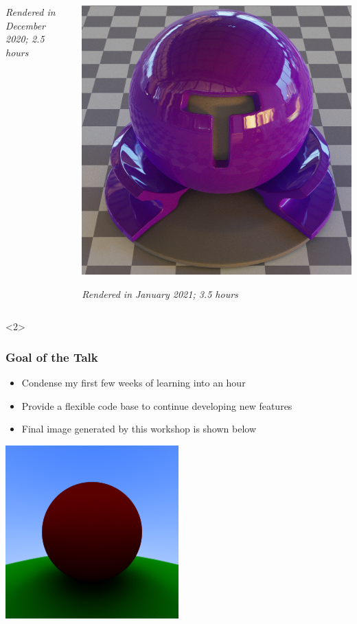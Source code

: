 \documentclass{beamer}
\begin{document}
\begin{frame}
{\begin{columns}[T]
\begin{column}{0.5\textwidth}
				\textit{Rendered in December 2020; 2.5 hours}
			\end{column}
			\begin{column}{0.5\textwidth}
				\centering
				\includegraphics[width=\textwidth]{media/material_sqr.png}
	
				\textit{Rendered in January 2021; 3.5 hours}
			\end{column}
		\end{columns}
	}<2>
	
\end{frame}

\begin{frame}
	\frametitle{Goal of the Talk}
	\begin{itemize}
		\item Condense my first few weeks of learning into an hour
		\item Provide a flexible code base to continue developing new features
		\item Final image generated by this workshop is shown below
	\end{itemize}
	\begin{center}
		\includegraphics[width=0.5\textwidth]{media/final.png}
	\end{center}
\end{frame}
\end{document}

